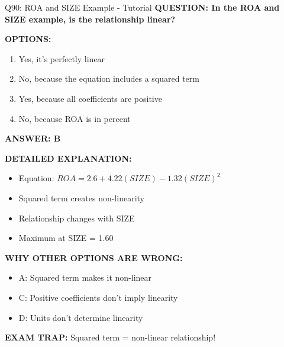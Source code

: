 \documentclass[8pt]{beamer}
\begin{document}
	\begin{frame}{Q90: ROA and SIZE Example - Tutorial}
		\fontsize{6.5}{7.5}\selectfont
		\textbf{QUESTION: In the ROA and SIZE example, is the relationship linear?}
		
		\vspace{0.1cm}
		\textbf{OPTIONS:}
		\begin{enumerate}
			\item Yes, it's perfectly linear
			\item No, because the equation includes a squared term
			\item Yes, because all coefficients are positive
			\item No, because ROA is in percent
		\end{enumerate}
		
		\vspace{0.1cm}
		\textcolor{myblue}{\textbf{ANSWER: B}}
		
		\vspace{0.1cm}
		\textbf{DETAILED EXPLANATION:}
		\begin{itemize}
			\item Equation: $ROA = 2.6 + 4.22(SIZE) - 1.32(SIZE)^2$
			\item Squared term creates non-linearity
			\item Relationship changes with SIZE
			\item Maximum at SIZE = 1.60
		\end{itemize}
		
		\vspace{0.1cm}
		\textcolor{myred}{\textbf{WHY OTHER OPTIONS ARE WRONG:}}
		\begin{itemize}
			\item \textcolor{myred}{A:} Squared term makes it non-linear
			\item \textcolor{myred}{C:} Positive coefficients don't imply linearity
			\item \textcolor{myred}{D:} Units don't determine linearity
		\end{itemize}
		
		\textcolor{myred}{\textbf{EXAM TRAP:}} Squared term = \textcolor{myblue}{non-linear relationship}!
	\end{frame}
	
\end{document}
